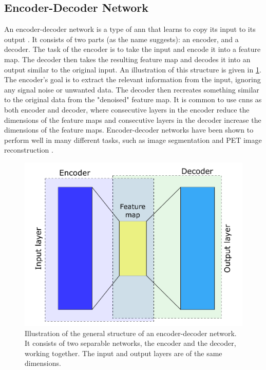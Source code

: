 \subsection{Encoder-Decoder Network}
\label{sec:ml:types:encoderdecoder}
An encoder-decoder network is a type of \gls{ann} that learns to copy its input to its output \cite{https://doi.org/10.1002/aic.690370209}. It consists of two parts (as the name suggests): an encoder, and a decoder. The task of the encoder is to take the input and encode it into a feature map. The decoder then takes the resulting feature map and decodes it into an output similar to the original input. An illustration of this structure is given in \cref{fig:encoderdecoder}. The encoder's goal is to extract the relevant information from the input, ignoring any signal noise or unwanted data. The decoder then recreates something similar to the original data from the "denoised" feature map. It is common to use \glspl{cnn} as both encoder and decoder, where consecutive layers in the encoder reduce the dimensions of the feature maps and consecutive layers in the decoder increase the dimensions of the feature maps. Encoder-decoder networks have been shown to perform well in many different tasks, such as image segmentation \cite{7803544} and PET image reconstruction \cite{HAGGSTROM2019253}.  

\begin{figure}[htbp]  
    \centering
    \includegraphics[width=.7\textwidth]{figures/encoderdecoder.pdf}
    \caption[Illustration of an encoder-decoder network]{Illustration of the general structure of an encoder-decoder network. It consists of two separable networks, the encoder and the decoder, working together. The input and output layers are of the same dimensions. }
    \label{fig:encoderdecoder}
\end{figure}

